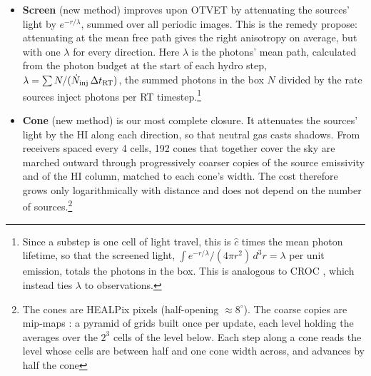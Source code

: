 \documentclass[iop]{openjournal}
\newcommand{\chat}{\hat{c}}
\begin{document}
\begin{itemize}
\item \textbf{Screen} (new method) improves upon OTVET by attenuating the sources' light
  by $e^{-r/\lambda}$, summed over all periodic images. This is the
  remedy \citet{wu21} propose: attenuating at the mean free path gives the
  right anisotropy on average, but with one $\lambda$ for every
  direction. Here $\lambda$ is the photons' mean path, calculated from the photon budget at the start of each
hydro step, $\lambda=\sum N/(\dot N_{\rm inj}\,\Delta t_{\rm RT})$, the
summed photons in the box $N$ divided by the rate sources inject photons per RT timestep.\footnote{Since a substep is one cell of light travel, this is $\chat$
times the mean photon lifetime, so that the screened light,
$\int e^{-r/\lambda}/(4\pi r^2)\,d^3r=\lambda$ per unit emission, totals
the photons in the box. This is analogous to CROC \citep{gnedin14}, which instead ties $\lambda$ to observations.}
\item \textbf{Cone} (new method) is our most complete closure. It
  attenuates the sources' light by the HI along each direction, so that
  neutral gas casts shadows. From receivers spaced every 4 cells, 192
  cones that together cover the sky are marched outward through
  progressively coarser copies of the source emissivity and of the HI
  column, matched to each cone's width. The cost therefore grows only
  logarithmically with distance and does not depend on the number of
  sources.\footnote{The cones are HEALPix pixels \citep{gorski05}
  (half-opening $\approx8^\circ$). The coarse copies are mip-maps
  \citep{williams83,crassin11}: a pyramid of grids built once per
  update, each level holding the averages over the $2^3$ cells of the
  level below. Each step along a cone reads the level whose cells are
  between half and one cone width across, and advances by half the cone
}
\end{itemize}
\end{document}
